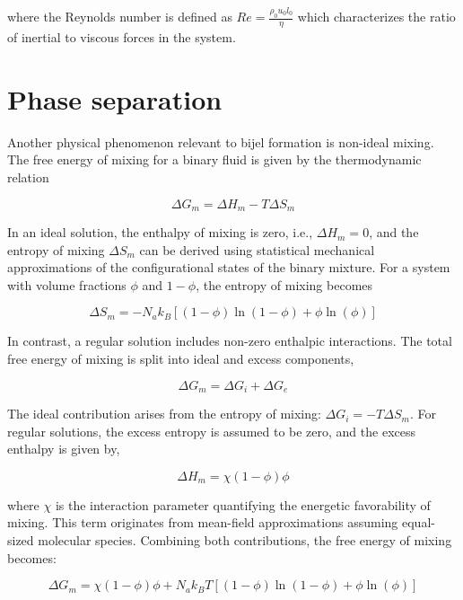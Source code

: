 where the Reynolds number is defined as $Re = \frac{\rho_0 u_0 l_0}{\eta}$ which characterizes the ratio of inertial to viscous forces in the system.

\section{Phase separation}
Another physical phenomenon relevant to bijel formation is non-ideal mixing. The free energy of mixing for a binary fluid is given by the thermodynamic relation

\begin{equation}
    \Delta G_m = \Delta H_m - T \Delta S_m
\end{equation}

In an ideal solution, the enthalpy of mixing is zero, i.e., $\Delta H_m = 0$, and the entropy of mixing $\Delta S_m$ can be derived using statistical mechanical approximations of the 
configurational states of the binary mixture. For a system with volume fractions $\phi$ and $1 - \phi$, the entropy of mixing becomes

\begin{equation}
    \Delta S_m = -N_a k_B \left[(1 - \phi)\ln(1 - \phi) + \phi \ln(\phi)\right]
\end{equation}

In contrast, a regular solution includes non-zero enthalpic interactions. The total free energy of mixing is split into ideal and excess components,

\begin{equation}
    \Delta G_m = \Delta G_i + \Delta G_e
\end{equation}

The ideal contribution arises from the entropy of mixing: $\Delta G_i = -T \Delta S_m$. For regular solutions, the excess entropy is assumed to be zero, and the excess enthalpy is given by,

\begin{equation}
    \Delta H_m = \chi (1 - \phi)\phi
\end{equation}

where $\chi$ is the interaction parameter quantifying the energetic favorability of mixing. This term originates from mean-field approximations assuming equal-sized molecular species. 
Combining both contributions, the free energy of mixing becomes:

\begin{equation}
    \Delta G_m = \chi (1 - \phi)\phi + N_a k_B T \left[(1 - \phi)\ln(1 - \phi) + \phi \ln(\phi)\right]
\end{equation}

